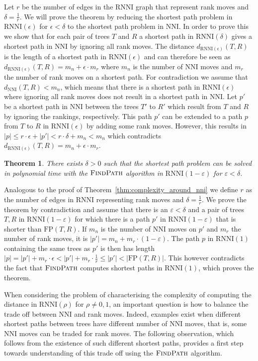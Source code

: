 \documentclass[11pt]{amsart}
\newtheorem{theorem}{Theorem}
\newcommand{\rnni}{\mathrm{RNNI}}
\newcommand{\findpath}{\textsc{FindPath}}
\newcommand{\nni}{\mathrm{NNI}}
\newcommand{\fp}{\mathrm{FP}}
\newcommand{\summary}[1]{} %
\begin{document}
\proof
Let $r$ be the number of edges in the $\rnni$ graph that represent rank moves and $\delta = \frac{1}{r}$.
We will prove the theorem by reducing the shortest path problem in $\rnni(\epsilon)$ for $\epsilon < \delta$ to the shortest path problem in $\nni$.
In order to prove this we show that for each pair of trees $T$ and $R$ a shortest path in $\rnni(\delta)$ gives a shortest path in $\nni$ by ignoring all rank moves.
The distance $d_{\rnni(\epsilon)}(T,R)$ is the length of a shortest path in $\rnni(\epsilon)$ and can therefore be seen as $d_{\rnni(\epsilon)}(T,R) = m_n + \epsilon \cdot m_r$ where $m_n$ is the number of $\nni$ moves and $m_r$ the number of rank moves on a shortest path.
For contradiction we assume that $d_{\nni}(T,R) < m_n$, which means that there is a shortest path in $\rnni(\epsilon)$ where ignoring all rank moves does not result in a shortest path in $\nni$.
Let $p'$ be a shortest path in $\nni$ between the trees $T'$ to $R'$ which result from $T$ and $R$ by ignoring the rankings, respectively.
This path $p'$ can be extended to a path $p$ from $T$ to $R$ in $\rnni(\epsilon)$ by adding some rank moves.
However, this results in $|p| \leq r \cdot \epsilon + |p'| < r \cdot \delta + m_n < m_n$ which contradicts $d_{\rnni(\epsilon)}(T,R) = m_n + \epsilon \cdot m_r$.
\endproof

\begin{theorem}
There exists $\delta > 0$ such that the shortest path problem can be solved in polynomial time with the $\findpath$ algorithm in $\rnni(1-\varepsilon)$ for $\varepsilon < \delta$.
\end{theorem}

\proof
Analogous to the proof of Theorem~\ref{thm:complexity_around_nni} we define $r$ as the number of edges in $\rnni$ representing rank moves and $\delta = \frac{1}{r}$.
We prove the theorem by contradiction and assume that there is an $\varepsilon < \delta$ and a pair of trees $T,R$ in $\rnni(1-\varepsilon)$ for which there is a path $p'$ in $\rnni(1-\varepsilon)$ that is shorter than $\fp(T,R)$.
If $m_n$ is the number of $\nni$ moves on $p'$ and $m_r$ the number of rank moves, it is $|p'| = m_n + m_r \cdot (1 - \varepsilon)$.
The path $p$ in $\rnni(1)$ containing the same trees as $p'$ is then has length $|p| = |p'| + m_r \cdot \epsilon < |p'| + m_r \cdot \frac{1}{r} \leq |p'| < |\fp(T,R)|$.
This however contradicts the fact that $\findpath$ computes shortest paths in $\rnni(1)$, which proves the theorem.
\endproof

\summary{Rank moves and $\nni$ moves can appear in different proportions on shortest paths and this is related to $\fp$ not computing shortest paths if $\rho \neq 1$}
When considering the problem of characterising the complexity of computing the distance in $\rnni(\rho)$ for $\rho \neq 0,1$, an important question is how to balance the trade off between $\nni$ and rank moves.
Indeed, examples exist when different shortest paths between trees have different number of $\nni$ moves, that is, some $\nni$ moves can be traded for rank moves.
The following observation, which follows from the existence of such different shortest paths, provides a first step towards understanding of this trade off using the $\findpath$ algorithm.
\end{document}
